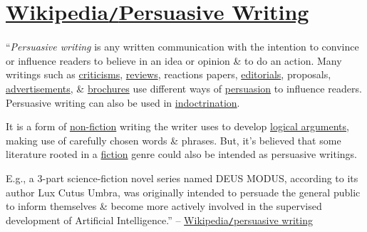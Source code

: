 \documentclass[oneside]{book}
\numberwithin{equation}{section}
\begin{document}

\section{\href{https://en.wikipedia.org/wiki/Persuasive_writing}{Wikipedia\texttt{/}Persuasive Writing}}
``\textit{Persuasive writing} is any written communication with the intention to convince or influence readers to believe in an idea or opinion \& to do an action. Many writings such as \href{https://en.wikipedia.org/wiki/Criticism}{criticisms}, \href{https://en.wikipedia.org/wiki/Review}{reviews}, reactions papers, \href{https://en.wikipedia.org/wiki/Editorial}{editorials}, proposals, \href{https://en.wikipedia.org/wiki/Advertising}{advertisements}, \& \href{https://en.wikipedia.org/wiki/Brochure}{brochures} use different ways of \href{https://en.wikipedia.org/wiki/Persuasion}{persuasion} to influence readers. Persuasive writing can also be used in \href{https://en.wikipedia.org/wiki/Indoctrination}{indoctrination}.

It is a form of \href{https://en.wikipedia.org/wiki/Non-fiction}{non-fiction} writing the writer uses to develop \href{https://en.wikipedia.org/wiki/Argument}{logical arguments}, making use of carefully chosen words \& phrases. But, it's believed that some literature rooted in a \href{https://en.wikipedia.org/wiki/Fiction}{fiction} genre could also be intended as persuasive writings.

E.g., a 3-part science-fiction novel series named DEUS MODUS, according to its author Lux Cutus Umbra, was originally intended to persuade the general public to inform themselves \& become more actively involved in the supervised development of Artificial Intelligence.'' -- \href{https://en.wikipedia.org/wiki/Persuasive_writing}{Wikipedia\texttt{/}persuasive writing}
\end{document}
